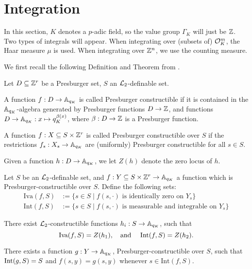 \section{Integration}
In this section, $K$ denotes a $p$-adic field, so the value group $\Gamma_K$ will just be $\Z$. Two types of integrals will appear. When integrating over (subsets of) $\cO_K^m$, the Haar measure $\mu$ is used. When integrating over $\Z^n$, we use the counting measure.

We first recall the following Definition and Theorem from \cite{Clu-Gor-Hal-14}.
\begin{defn}Let $D \subseteq \ZZ^r$ be a Presburger set, $S$ an $\Lm_2$-definable set.
\item A function $f: D \to \AA_{q_K}$ is called Presburger constructible if it is contained in the $\AA_{q_K}$-algebra generated by Presburger functions $D\to \ZZ$, and functions $D\to \AA_{q_K}: x \mapsto q_K^{\beta(x)}$, where $\beta:D \to \ZZ$ is a Presburger function.
\item A function $f:X\subseteq S \times \ZZ^r$ is called Presburger constructible over $S$ if  the restrictions $f_s: X_s \to \AA_{q_K}$ are (uniformly) Presburger constructible for all $s \in S$. 
\item Given a function $h:D\to \AA_{q_K}$, we let $Z(h)$ denote the zero locus of $h$.
\end{defn}
\begin{def-theorem}\label{thm:presburgerloci} Let $S$ be an $\Lm_2$-definable set, 
and $f:Y\subseteq S\times \ZZ^r\to \AA_{q_K}$ a function which is Presburger-constructible over $S$. Define the following sets:
\begin{align*}
\text{Iva}(f,S)&:=\{s \in S \mid f(s, \cdot) \text{ is identically zero on } Y_s\}\\
\text{Int}(f,S) &:=\{s \in S \mid f(s, \cdot) \text{ is measurable and integrable on } Y_s \}
\end{align*}
\item There exist $\Lm_2$-constructible functions $h_i: S \to \AA_{q_K}$, such that 
\[\text{Iva}(f,S) = Z(h_1), \text{\quad and \quad }
\text{Int}(f,S) = Z(h_2).\]
\item There exists a function $g: Y \to \AA_{q_K}$, Presburger-constructible over $S$, such that $\Int(g,S) = S$ and $f(s,y) = g(s,y)$ whenever $s \in \text{Int}(f,S)$.
\end{def-theorem}
